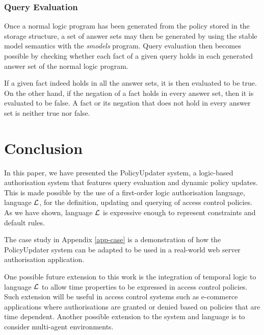 \documentclass[11pt, twocolumn]{article}
\begin{document}
      \subsubsection{Query Evaluation}

        Once a normal logic program has been generated from the policy stored
        in the storage structure, a set of answer sets may then be generated
        by using the stable model semantics with the {\em smodels}\footnotemark
        program. Query evaluation then becomes possible by checking whether
        each fact of a given query holds in each generated answer set of the
        normal logic program.


        If a given fact indeed holds in all the answer sets, it is then
        evaluated to be true. On the other hand, if the negation of a fact
        holds in every answer set, then it is evaluated to be false. A fact
        or its negation that does not hold in every answer set is neither true
        nor false.

  \section{Conclusion}
    \label{sec-conclusion}

    In this paper, we have presented the PolicyUpdater system, a logic-based
    authorisation system that features query evaluation and dynamic policy
    updates. This is made possible by the use of a first-order logic
    authorisation language, language ${\cal L}$, for the definition, updating
    and querying of access control policies. As we have shown, language
    ${\cal L}$ is expressive enough to represent constraints and default rules.

    The case study in Appendix \ref{app-case} is a demonstration of how the
    PolicyUpdater system can be adapted to be used in a real-world web server
    authorisation application.

    One possible future extension to this work is the integration of temporal
    logic to language ${\cal L}$ to allow time properties to be expressed in
    access control policies. Such extension will be useful in access control
    systems such as e-commerce applications where authorisations are granted
    or denied based on policies that are time dependent. Another possible
    extension to the system and language is to consider multi-agent
    environments.
\end{document}
